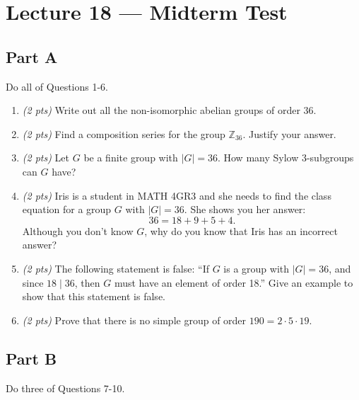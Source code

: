 \section{Lecture 18 — Midterm Test}

\subsection*{Part A}

Do all of Questions 1-6.

\begin{enumerate}[label={\color{main}\sffamily\bfseries \arabic*.}]
	\item \textit{(2 pts)} Write out all the non-isomorphic abelian groups of order 36.
	\item \textit{(2 pts)} Find a composition series for the group $\mathbb Z_{36}$. Justify your answer.
	\item \textit{(2 pts)} Let $G$ be a finite group with $|G|=36$. How many Sylow 3-subgroups can $G$ have?
	\item \textit{(2 pts)} Iris is a student in MATH 4GR3 and she needs to find the class equation for a group $G$ with $|G|=36$. She shows you her answer:
	$$36=18+9+5+4.$$
	Although you don't know $G$, why do you know that Iris has an incorrect answer?
	\item \textit{(2 pts)} The following statement is false: ``If $G$ is a group with $|G|=36$, and since $18\mid 36$, then $G$ must have an element of order 18.'' Give an example to show that this statement is false.
	\item \textit{(2 pts)} Prove that there is no simple group of order $190=2\cdot 5\cdot 19$.
\end{enumerate}

\subsection*{Part B}

Do three of Questions 7-10.

